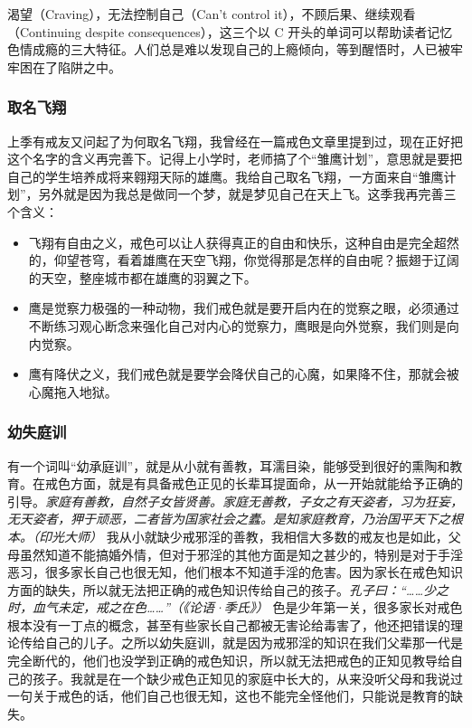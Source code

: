 渴望（Craving），无法控制自己（Can't control it），不顾后果、继续观看（Continuing despite consequences），这三个以 C 开头的单词可以帮助读者记忆色情成瘾的三大特征。人们总是难以发现自己的上瘾倾向，等到醒悟时，人已被牢牢困在了陷阱之中。

\subsubsection{取名飞翔}

上季有戒友又问起了为何取名飞翔，我曾经在一篇戒色文章里提到过，现在正好把这个名字的含义再完善下。记得上小学时，老师搞了个“雏鹰计划”，意思就是要把自己的学生培养成将来翱翔天际的雄鹰。我给自己取名飞翔，一方面来自“雏鹰计划”，另外就是因为我总是做同一个梦，就是梦见自己在天上飞。这季我再完善三个含义：

\begin{itemize}
    \item 飞翔有自由之义，戒色可以让人获得真正的自由和快乐，这种自由是完全超然的，仰望苍穹，看着雄鹰在天空飞翔，你觉得那是怎样的自由呢？振翅于辽阔的天空，整座城市都在雄鹰的羽翼之下。
    \item 鹰是觉察力极强的一种动物，我们戒色就是要开启内在的觉察之眼，必须通过不断练习观心断念来强化自己对内心的觉察力，鹰眼是向外觉察，我们则是向内觉察。
    \item 鹰有降伏之义，我们戒色就是要学会降伏自己的心魔，如果降不住，那就会被心魔拖入地狱。
\end{itemize}

\subsubsection{幼失庭训}

有一个词叫“幼承庭训”，就是从小就有善教，耳濡目染，能够受到很好的熏陶和教育。在戒色方面，就是有具备戒色正见的长辈耳提面命，从一开始就能给予正确的引导。\textit{家庭有善教，自然子女皆贤善。家庭无善教，子女之有天姿者，习为狂妄，无天姿者，狎于顽恶，二者皆为国家社会之蠹。是知家庭教育，乃治国平天下之根本。（印光大师）} 我从小就缺少戒邪淫的善教，我相信大多数的戒友也是如此，父母虽然知道不能搞婚外情，但对于邪淫的其他方面是知之甚少的，特别是对于手淫恶习，很多家长自己也很无知，他们根本不知道手淫的危害。因为家长在戒色知识方面的缺失，所以就无法把正确的戒色知识传给自己的孩子。\textit{孔子曰：“……少之时，血气未定，戒之在色……”（《论语·季氏》）} 色是少年第一关，很多家长对戒色根本没有一丁点的概念，甚至有些家长自己都被无害论给毒害了，他还把错误的理论传给自己的儿子。之所以幼失庭训，就是因为戒邪淫的知识在我们父辈那一代是完全断代的，他们也没学到正确的戒色知识，所以就无法把戒色的正知见教导给自己的孩子。我就是在一个缺少戒色正知见的家庭中长大的，从来没听父母和我说过一句关于戒色的话，他们自己也很无知，这也不能完全怪他们，只能说是教育的缺失。

